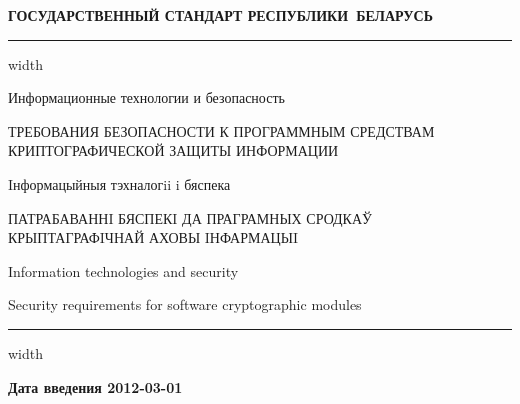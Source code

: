 \newpage
\setcounter{page}{1}
\pagestyle{headings}

\begin{center}
{\bfseries
ГОСУДАРСТВЕННЫЙ СТАНДАРТ РЕСПУБЛИКИ~БЕЛАРУСЬ
\vskip 2pt
\hrule width\textwidth

\vskip 9pt

Информационные технологии и безопасность

ТРЕБОВАНИЯ БЕЗОПАСНОСТИ К ПРОГРАММНЫМ СРЕДСТВАМ КРИПТОГРАФИЧЕСКОЙ 
ЗАЩИТЫ ИНФОРМАЦИИ

\vskip 9pt

Iнформацыйныя тэхналогii i бяспека

ПАТРАБАВАННI БЯСПЕКI ДА
ПРАГРАМНЫХ СРОДКАЎ КРЫПТАГРАФIЧНАЙ АХОВЫ IНФАРМАЦЫI
}

\vskip 9pt

Information technologies and security

Security requirements for software cryptographic modules

\vskip 4pt                
\hrule width \textwidth
\end{center}

\mbox{}\hfill{\bfseries Дата введения 2012-03-01}


